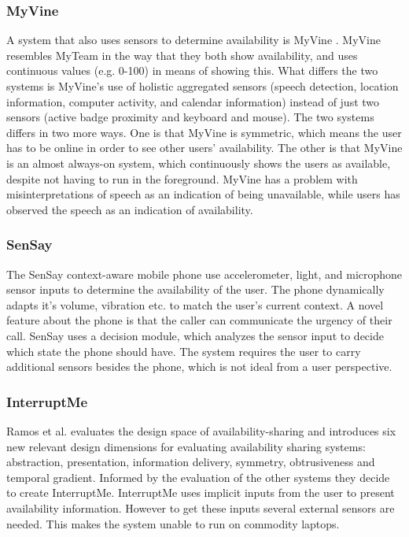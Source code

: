 \documentclass{sigchi}
\begin{document}
\subsubsection{MyVine}
A system that also uses sensors to determine availability is MyVine \cite{fogarty2004myvine}.
MyVine resembles MyTeam in the way that they both show availability, and uses continuous values (e.g. 0-100) in means of showing this.
What differs the two systems is MyVine's use of holistic aggregated sensors (speech detection, location information, computer activity, and calendar information) instead of just two sensors (active badge proximity and keyboard and mouse).
The two systems differs in two more ways.
One is that MyVine is symmetric, which means the user has to be online in order to see other users' availability.
The other is that MyVine is an almost always-on system, which continuously shows the users as available, despite not having to run in the foreground.
MyVine has a problem with misinterpretations of speech as an indication of being unavailable, while users has observed the speech as an indication of availability.

\subsubsection{SenSay}
The SenSay context-aware mobile phone \cite{siewiorek2003sensay} use accelerometer, light, and microphone sensor inputs to determine the availability of the user.
The phone dynamically adapts it's volume, vibration etc. to match the user's current context.
A novel feature about the phone is that the caller can communicate the urgency of their call.
SenSay uses a decision module, which analyzes the sensor input to decide which state the phone should have.
The system requires the user to carry additional sensors besides the phone, which is not ideal from a user perspective.

\subsubsection{InterruptMe}
Ramos et al.\cite{hincapie2011design} evaluates the design space of availability-sharing and introduces six new relevant design dimensions for evaluating availability sharing systems: abstraction, presentation, information delivery, symmetry, obtrusiveness and temporal gradient.
Informed by the evaluation of the other systems they decide to create InterruptMe.
InterruptMe uses implicit inputs from the user to present availability information.
However to get these inputs several external sensors are needed.
This makes the system unable to run on commodity laptops.
\end{document}
